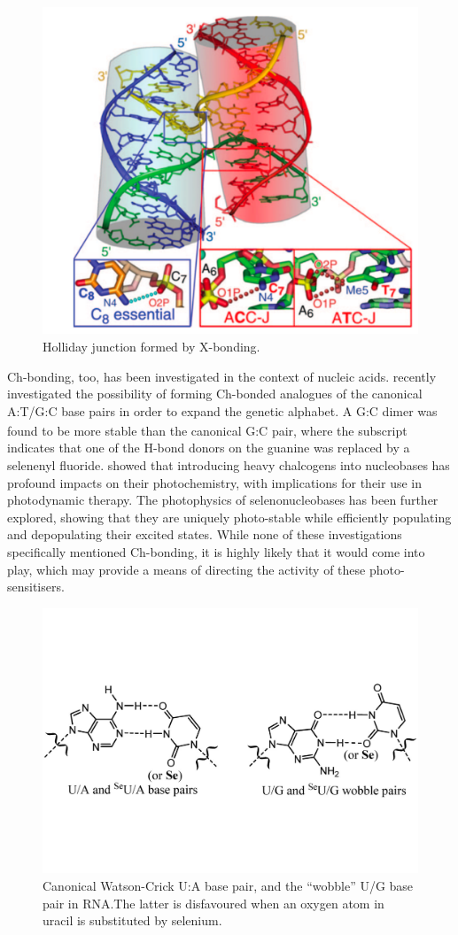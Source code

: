 \begin{refsection}
\begin{figure}
    \centering
    \includegraphics[width=0.6\linewidth]{Figures/holliday-junction.pdf}
    \caption[Holliday junction formed by X-bonding.]{Holliday junction formed by X-bonding.\autocite{Voth2007}}\label{fig:holliday-junction}
\end{figure}

Ch-bonding, too, has been investigated in the context of nucleic acids.
 recently investigated the possibility of forming Ch-bonded analogues of the canonical A:T/G:C base pairs in order to expand the genetic alphabet.\autocite{Sharma2020}
A G\textsubscript{}:C dimer was found to be more stable than the canonical G:C pair, where the  subscript indicates that one of the H-bond donors on the guanine was replaced by a selenenyl fluoride.
 showed that introducing heavy chalcogens into nucleobases has profound impacts on their photochemistry, with implications for their use in photodynamic therapy.\autocite{Farrell2018}
The photophysics of selenonucleobases has been further explored, showing that they are uniquely photo-stable while efficiently populating and depopulating their excited states.\autocite{Mai2019,Peng2020,Fang2019,Uleany2020}
While none of these investigations specifically mentioned Ch-bonding, it is highly likely that it would come into play, which may provide a means of directing the activity of these photo-sensitisers.

\begin{figure}
    \centering
    \includegraphics[width=0.6\linewidth]{Figures/wobble-bp.pdf}
    \caption[Canonical Watson-Crick U/A base pair, and the ``wobble'' U:G base pair in RNA.]{Canonical Watson-Crick U:A base pair, and the ``wobble'' U/G base pair in RNA.\@ The latter is disfavoured when an oxygen atom in uracil is substituted by selenium.}\label{fig:wobble-bp}
\end{figure}


\end{refsection}
